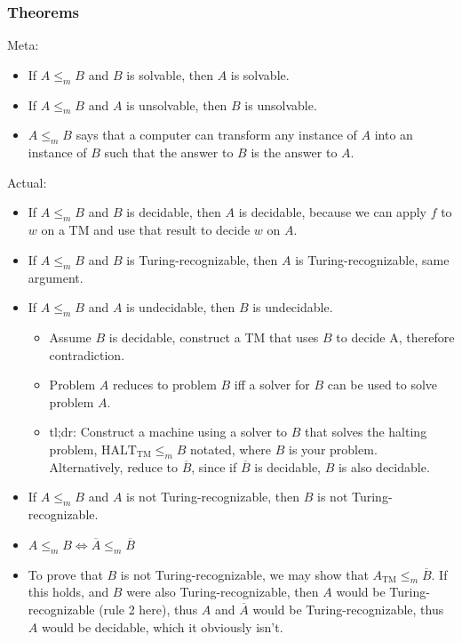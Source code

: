 \documentclass[9pt, twocolumn]{extarticle}
\begin{document}
\subsubsection{Theorems}
Meta:
\begin{itemize}
  \item If $A\le_m B$ and $B$ is solvable, then $A$ is solvable.
  \item If $A\le_m B$ and $A$ is unsolvable, then $B$ is unsolvable.
  \item $A\le_m B$ says that a computer can transform any instance of $A$ into an instance of $B$ such that the answer to $B$ is the answer to $A$.
\end{itemize}
Actual:
\begin{itemize}
  \item If $A\le_m B$ and $B$ is decidable, then $A$ is decidable, because we can apply $f$ to $w$ on a TM and use that result to decide $w$ on $A$.
  \item If $A\le_m B$ and $B$ is Turing-recognizable, then $A$ is Turing-recognizable, same argument.
  \item If $A\le_m B$ and $A$ is undecidable, then $B$ is undecidable.
        \begin{itemize}
          \item Assume $B$ is decidable, construct a TM that uses $B$ to decide A, therefore contradiction.
          \item Problem $A$ reduces to problem $B$ iff a solver for $B$ can be used to solve problem $A$.
          \item tl;dr: Construct a machine using a solver to $B$ that solves the halting problem, $\text{HALT}_\text{TM}\le_m  B$ notated, where $B$ is your problem. Alternatively, reduce to $\overline{B}$, since if $\overline{B}$ is decidable, $B$ is also decidable.
        \end{itemize}
  \item If $A\le_m B$ and $A$ is not Turing-recognizable, then $B$ is not Turing-recognizable.
  \item $A\le_m B \Longleftrightarrow \overline{A}\le_m \overline{B}$
  \item To prove that $B$ is not Turing-recognizable, we may show that $A_\text{TM}\le_m \overline{B}$. If this holds, and $B$ were also Turing-recognizable, then $A$ would be Turing-recognizable (rule 2 here), thus $A$ and $\overline{A}$ would be Turing-recognizable, thus $A$ would be decidable, which it obviously isn't.
\end{itemize}
\end{document}
